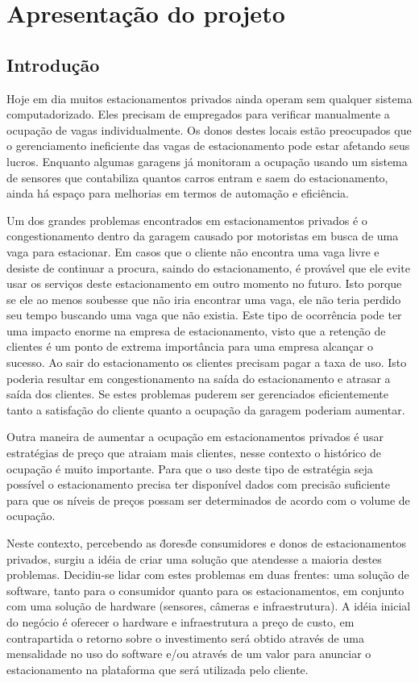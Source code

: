 \part{Apresentação do projeto}

\chapter[Introdução]{Introdução}

Hoje em dia muitos estacionamentos privados ainda operam sem qualquer sistema computadorizado. Eles precisam de empregados para verificar manualmente a ocupação de vagas individualmente. Os donos destes locais estão preocupados que o gerenciamento ineficiente das vagas de estacionamento pode estar afetando seus lucros. Enquanto algumas garagens já monitoram a ocupação usando um sistema de sensores que contabiliza quantos carros entram e saem do estacionamento, ainda há espaço para melhorias em termos de automação e eficiência.

Um dos grandes problemas encontrados em estacionamentos privados é o congestionamento dentro da garagem causado por motoristas em busca de uma vaga para estacionar. Em casos que o cliente não encontra uma vaga livre e desiste de continuar a procura, saindo do estacionamento, é provável que ele evite usar os serviços deste estacionamento em outro momento no futuro. Isto porque se ele ao menos soubesse que não iria encontrar uma vaga, ele não teria perdido seu tempo buscando uma vaga que não existia. Este tipo de ocorrência pode ter uma impacto enorme na empresa de estacionamento, visto que a retenção de clientes é um ponto de extrema importância para uma empresa alcançar o sucesso. Ao sair do estacionamento os clientes precisam pagar a taxa de uso. Isto poderia resultar em congestionamento na saída do estacionamento e atrasar a saída dos clientes. Se estes problemas puderem ser gerenciados eficientemente tanto a satisfação do cliente quanto a ocupação da garagem poderiam aumentar.

Outra maneira de aumentar a ocupação em estacionamentos privados é usar estratégias de preço que atraiam mais clientes, nesse contexto o histórico de ocupação é muito importante. Para que o uso deste tipo de estratégia seja possível o estacionamento precisa ter disponível dados com precisão suficiente para que os níveis de preços possam ser determinados de acordo com o volume de ocupação.

Neste contexto, percebendo as \"dores\" de consumidores e donos de estacionamentos privados, surgiu a idéia de criar uma solução que atendesse a maioria destes problemas. Decidiu-se lidar com estes problemas em duas frentes: uma solução de software, tanto para o consumidor quanto para os estacionamentos, em conjunto com uma solução de hardware (sensores, câmeras e infraestrutura). A idéia inicial do negócio é oferecer o hardware e infraestrutura a preço de custo, em contrapartida o retorno sobre o investimento será obtido através de uma mensalidade no uso do software e/ou através de um valor para anunciar o estacionamento na plataforma que será utilizada pelo cliente.

